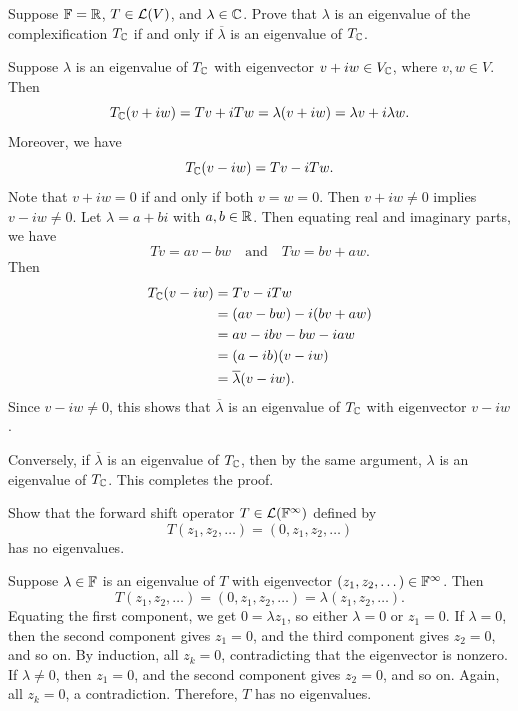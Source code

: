 \begin{exc}
\begin{exercise}
Suppose $\mathbb{F}=\mathbb{R}$, $T\in\mathcal{L}(V)$, and $\lambda\in\mathbb{C}$. Prove that $\lambda$ is an
eigenvalue of the complexification $T_{\mathbb{C}}$ if and only if $\overline{\lambda}$
is an eigenvalue of $T_{\mathbb{C}}$.
\end{exercise}
\begin{solution}
Suppose $\lambda$ is an eigenvalue of $T_{\mathbb{C}}$ with eigenvector
$v+iw\in V_{\mathbb{C}}$, where $v,w\in V$. Then
\[ T_{\mathbb{C}}(v+iw) = Tv+iTw = \lambda(v+iw) = \lambda v+i\lambda w. \]
Moreover, we have
\[ T_{\mathbb{C}}(v-iw) = Tv-iTw. \]
Note that $v+iw=0$ if and only if both $v=w=0$. Then $v+iw\ne0$ implies
$v-iw\ne0$. Let $\lambda=a+bi$ with $a,b\in\mathbb{R}$. Then equating real and
imaginary parts, we have
\[ Tv=av-bw \quad\text{and}\quad Tw=bv+aw. \]
Then
\begin{align*}
T_{\mathbb{C}}(v-iw) &= Tv-iTw\\
  &= (av-bw)-i(bv+aw)\\
  &= av-ibv-bw-iaw\\
  &= (a-ib)(v-iw)\\
  &= \overline{\lambda}(v-iw).
\end{align*}
Since $v-iw\ne0$, this shows that $\overline{\lambda}$ is an eigenvalue of
$T_{\mathbb{C}}$ with eigenvector $v-iw$.

Conversely, if $\overline{\lambda}$ is an eigenvalue of $T_{\mathbb{C}}$, then by the
same argument, $\lambda$ is an eigenvalue of $T_{\mathbb{C}}$. This completes the
proof.
\end{solution}

\begin{exercise}
Show that the forward shift operator $T\in\mathcal{L}(\mathbb{F}^\infty)$ defined by
\[ T(z_1,z_2,\dots) = (0,z_1,z_2,\dots) \]
has no eigenvalues.
\end{exercise}
\begin{solution}
Suppose $\lambda\in\mathbb{F}$ is an eigenvalue of $T$ with eigenvector
$(z_1,z_2,\dots)\in\mathbb{F}^\infty$. Then
\[ T(z_1,z_2,\dots) = (0,z_1,z_2,\dots) = \lambda(z_1,z_2,\dots). \]
Equating the first component, we get $0=\lambda z_1$, so either $\lambda=0$ or
$z_1=0$. If $\lambda=0$, then the second component gives $z_1=0$, and the third
component gives $z_2=0$, and so on. By induction, all $z_k=0$, contradicting
that the eigenvector is nonzero. If $\lambda\ne0$, then $z_1=0$, and the second
component gives $z_2=0$, and so on. Again, all $z_k=0$, a contradiction.
Therefore, $T$ has no eigenvalues.
\end{solution}


\end{exc}
